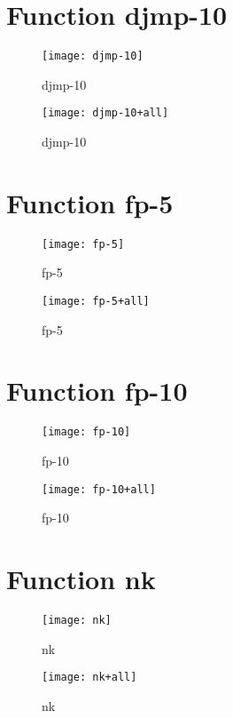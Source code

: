 \section{Function djmp-10}
\begin{center}

\end{center}
\begin{center}

\end{center}
\begin{figure}[h]
\centering
\texttt{[image: djmp-10]}
\caption{djmp-10}
\end{figure}
\begin{figure}[h]
\centering
\texttt{[image: djmp-10+all]}
\caption{djmp-10}
\end{figure}
\newpage
\section{Function fp-5}
\begin{center}

\end{center}
\begin{center}

\end{center}
\begin{figure}[h]
\centering
\texttt{[image: fp-5]}
\caption{fp-5}
\end{figure}
\begin{figure}[h]
\centering
\texttt{[image: fp-5+all]}
\caption{fp-5}
\end{figure}
\newpage
\section{Function fp-10}
\begin{center}

\end{center}
\begin{center}

\end{center}
\begin{figure}[h]
\centering
\texttt{[image: fp-10]}
\caption{fp-10}
\end{figure}
\begin{figure}[h]
\centering
\texttt{[image: fp-10+all]}
\caption{fp-10}
\end{figure}
\newpage
\section{Function nk}
\begin{center}

\end{center}
\begin{center}

\end{center}
\begin{figure}[h]
\centering
\texttt{[image: nk]}
\caption{nk}
\end{figure}
\begin{figure}[h]
\centering
\texttt{[image: nk+all]}
\caption{nk}
\end{figure}
\newpage
